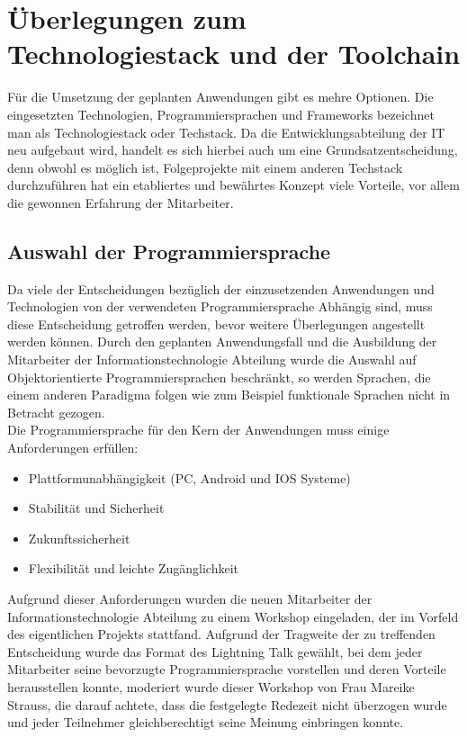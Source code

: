 \section{Überlegungen zum Technologiestack und der Toolchain}
\label{Technologiestack}

Für die Umsetzung der geplanten Anwendungen gibt es mehre Optionen. Die eingesetzten Technologien, Programmiersprachen und Frameworks bezeichnet man als Technologiestack oder Techstack. Da die Entwicklungsabteilung der IT neu aufgebaut wird, handelt es sich hierbei auch um eine Grundsatzentscheidung, denn obwohl es möglich ist, Folgeprojekte mit einem anderen Techstack durchzuführen hat ein etabliertes und bewährtes Konzept viele Vorteile, vor allem die gewonnen Erfahrung der Mitarbeiter.\\

\subsection{Auswahl der Programmiersprache}

Da viele der Entscheidungen bezüglich der einzusetzenden Anwendungen und Technologien von der verwendeten Programmiersprache Abhängig sind, muss diese Entscheidung getroffen werden, bevor weitere Überlegungen angestellt werden können. Durch den geplanten Anwendungsfall und die Ausbildung der Mitarbeiter der Informationstechnologie Abteilung wurde die Auswahl auf Objektorientierte Programmiersprachen beschränkt, so werden Sprachen, die einem anderen Paradigma folgen wie zum Beispiel funktionale Sprachen nicht in Betracht gezogen.\\

Die Programmiersprache für den Kern der Anwendungen muss einige Anforderungen erfüllen:
\begin{itemize}
  \item Plattformunabhängigkeit (PC, Android und IOS Systeme)
  \item Stabilität und Sicherheit
  \item Zukunftssicherheit
  \item Flexibilität und leichte Zugänglichkeit
\end{itemize}

Aufgrund dieser Anforderungen wurden die neuen Mitarbeiter der Informationstechnologie Abteilung zu einem Workshop eingeladen, der im Vorfeld des eigentlichen Projekts stattfand. Aufgrund der Tragweite der zu treffenden Entscheidung wurde das Format des Lightning Talk gewählt, bei dem jeder Mitarbeiter seine bevorzugte Programmiersprache vorstellen und deren Vorteile herausstellen konnte, moderiert wurde dieser Workshop von Frau Mareike Strauss, die darauf achtete, dass die festgelegte Redezeit nicht überzogen wurde und jeder Teilnehmer gleichberechtigt seine Meinung einbringen konnte.\\ 


